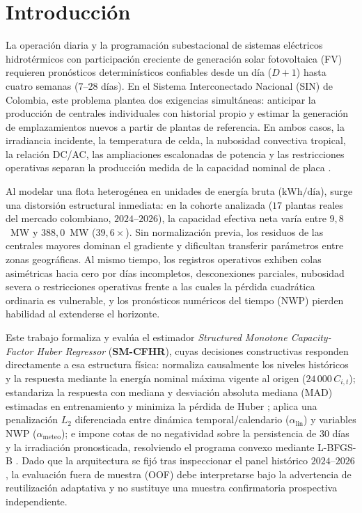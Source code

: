 \section{Introducción}\label{sec:intro}

La operación diaria y la programación subestacional de sistemas eléctricos hidrotérmicos con participación creciente de generación solar fotovoltaica (FV) requieren pronósticos determinísticos confiables desde un día ($D+1$) hasta cuatro semanas ($7$--$28$ días). En el Sistema Interconectado Nacional (SIN) de Colombia, este problema plantea dos exigencias simultáneas: anticipar la producción de centrales individuales con historial propio y estimar la generación de emplazamientos nuevos a partir de plantas de referencia. En ambos casos, la irradiancia incidente, la temperatura de celda, la nubosidad convectiva tropical, la relación DC/AC, las ampliaciones escalonadas de potencia y las restricciones operativas separan la producción medida de la capacidad nominal de placa \cite{mueller2016yield,trigo2021models,purohit2018performance}.

Al modelar una flota heterogénea en unidades de energía bruta ($\text{kWh/día}$), surge una distorsión estructural inmediata: en la cohorte analizada ($17$ plantas reales del mercado colombiano, $2024$--$2026$), la capacidad efectiva neta varía entre $9{,}8$~MW y $388{,}0$~MW ($39{,}6\times$). Sin normalización previa, los residuos de las centrales mayores dominan el gradiente y dificultan transferir parámetros entre zonas geográficas. Al mismo tiempo, los registros operativos exhiben colas asimétricas hacia cero por días incompletos, desconexiones parciales, nubosidad severa o restricciones operativas frente a las cuales la pérdida cuadrática ordinaria es vulnerable, y los pronósticos numéricos del tiempo (NWP) pierden habilidad al extenderse el horizonte.

Este trabajo formaliza y evalúa el estimador \textit{Structured Monotone Capacity-Factor Huber Regressor} (\textbf{SM-CFHR}), cuyas decisiones constructivas responden directamente a esa estructura física: normaliza causalmente los niveles históricos y la respuesta mediante la energía nominal máxima vigente al origen ($24\,000\,C_{i,t}$); estandariza la respuesta con mediana y desviación absoluta mediana (MAD) estimadas en entrenamiento y minimiza la pérdida de Huber \cite{huber1964,huber2009robust}; aplica una penalización $L_2$ diferenciada entre dinámica temporal/calendario ($\alpha_{\mathrm{lin}}$) y variables NWP ($\alpha_{\mathrm{meteo}}$); e impone cotas de no negatividad sobre la persistencia de $30$ días y la irradiación pronosticada, resolviendo el programa convexo mediante L-BFGS-B \cite{byrd1995lbfgsb,zhu1997lbfgsb}. Dado que la arquitectura se fijó tras inspeccionar el panel histórico $2024$--$2026$, la evaluación fuera de muestra (OOF) debe interpretarse bajo la advertencia de reutilización adaptativa \cite{cawley2010overfit} y no sustituye una muestra confirmatoria prospectiva independiente.

